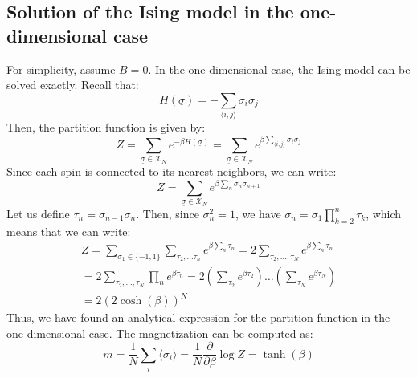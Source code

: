 \subsection{Solution of the Ising model in the one-dimensional case}
For simplicity, assume $B=0$. In the one-dimensional case, the Ising model can be solved exactly. Recall that:
\begin{equation}
    H(\underline{\sigma}) = -\sum_{\langle i,j\rangle}\sigma_i\sigma_j
\end{equation}
Then, the partition function is given by:
\begin{equation}
    Z = \sum_{\underline{\sigma}\in\mathcal{X}_N}e^{-\beta H(\underline{\sigma})} =
    \sum_{\underline{\sigma}\in\mathcal{X}_N}e^{\beta\sum_{\langle i,j\rangle}\sigma_i\sigma_j}
\end{equation}
Since each spin is connected to its nearest neighbors, we can write:
\begin{equation}
    Z =  \sum_{\underline{\sigma}\in\mathcal{X}_N}e^{\beta\sum_n\sigma_n\sigma_{n+1}}
\end{equation}
Let us define $\tau_n = \sigma_{n-1}\sigma_{n}$. Then, since $\sigma_n^2=1$, we have $\sigma_n = \sigma_1 \prod_{k=2}^n \tau_k$, which means that we can write:
\begin{equation}
    \begin{gathered}
    Z =  \sum_{\sigma_1\in\{-1,1\}}\sum_{\tau_2,\dots\tau_n}e^{\beta\sum_n\tau_n}
    = 2\sum_{\tau_2,\dots,\tau_N}e^{\beta\sum_n\tau_n}\\
    = 2\sum_{\tau_2,\dots,\tau_N}\prod_n e^{\beta\tau_n}
    = 2(\sum_{\tau_2}e^{\beta\tau_2})\dots(\sum_{\tau_N}e^{\beta\tau_N})\\
    = 2(2\cosh(\beta))^{N}
    \end{gathered}
\end{equation}
Thus, we have found an analytical expression for the partition function in the one-dimensional case. The magnetization can be computed as:
\begin{equation}
    \label{eq:ising}
    m = \frac{1}{N}\sum_i \langle \sigma_i \rangle = \frac{1}{N}\frac{\partial}{\partial \beta}\log Z = \tanh(\beta)
\end{equation}


